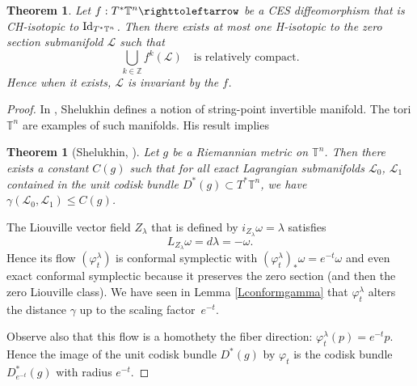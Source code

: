 \documentclass[JEP,XML,SOM,Unicode,published]{cedram}
\newtheorem{theorem}{Theorem}
\newtheorem*{theorem*}{Theorem}
\theoremstyle{definition}
\def\Z{\mathbb{Z}}
\def\T{\mathbb{T}}
\def\cL{{\mathcal L}}
\begin{document}

\begin{theorem}
Let $f:T^*\T^n \righttoleftarrow$ be a CES diffeomorphism that is CH-isotopic to ${\rm Id}_{T^*\T^n}$. Then there exists at most one H-isotopic to the zero section submanifold $\cL$ such that
\[
\bigcup_{k\in\Z}f^k(\cL)\quad\text{is relatively compact}.
\]
Hence when it exists, $\cL$ is invariant by the $f$.
\end{theorem}

\begin{proof}
In \cite{Shel2020}, Shelukhin defines a notion of string-point invertible manifold. The tori $\T^n$ are examples of such manifolds. His result implies
\begin{theorem*}[Shelukhin, \cite{Shel2020}] Let $g$ be a Riemannian metric
on $\T^n$. Then there exists a constant $C(g)$ such that for all exact Lagrangian submanifolds
$\cL_0$, $\cL_1$ contained in the unit codisk bundle $D^*(g)\subset T^*\T^n$, we have
$\gamma (\cL_0, \cL_1) \leq C(g)$.
\end{theorem*}

The Liouville vector field $Z_\lambda$ that is defined by $i_{Z_\lambda}\omega=\lambda$ satisfies
\[
L_{Z_\lambda}\omega=d\lambda=-\omega.
\]
Hence its flow $(\varphi^\lambda_t)$ is conformal symplectic with $(\varphi^\lambda_{t})_*\omega=e^{-t}\omega$ and even exact conformal symplectic because it preserves the zero section (and then the zero Liouville class). We have seen in Lemma \ref{Lconformgamma} that $\varphi^\lambda_t$ alters the distance $\gamma$ up to the scaling factor~$e^{-t}$.

Observe also that this flow is a homothety the fiber direction: $\varphi^\lambda_t(p)=e^{-t}p$. Hence the image of the unit codisk bundle $D^*(g)$ by $\varphi_t$ is the codisk bundle $D_{e^{-t}}^*(g)$ with radius $e^{-t}$.


\end{proof}
\end{document}
